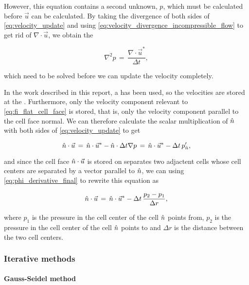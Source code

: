 However, this equation contains a second unknown, $p$, which must be calculated before $\vec{u}$ can be calculated. By taking the divergence of both sides of \eqref{eq:velocity_update} and using \eqref{eq:velocity_divergence_incompressible_flow} to get rid of $\nabla\cdot\vec{u}$, we obtain the 

\begin{equation} \label{eq:pressure_poissin_equation}
\nabla^2 p \,=\, \frac{\nabla\cdot\vec{u}^*}{\Delta t},
\end{equation}

which need to be solved before we can update the velocity completely.

In the work described in this report, a  has been used, so the velocities are stored at the . Furthermore, only the velocity component relevant to \eqref{eq:fi_flat_cell_face} is stored, that is, only the velocity component parallel to the cell face normal. We can therefore calculate the scalar multiplication of $\hat{n}$ with both sides of \eqref{eq:velocity_update} to get

\begin{equation} \label{eq:velocity_update_staggered_grid_pressure_derivative}
\hat{n}\cdot\vec{u} \,=\, \hat{n}\cdot\vec{u}^* - \hat{n}\cdot\Delta t\nabla p \,=\, \hat{n}\cdot\vec{u}^* - \Delta t\,p'_{\hat{n}},
\end{equation}

and since the cell face $\hat{n}\cdot\vec{u}$ is stored on separates two adjactent cells whose cell centers are separated by a vector parallel to $\hat{n}$, we can using \eqref{eq:phi_derivative_final} to rewrite this equation as

\begin{equation} \label{eq:velocity_update_staggered_grid_final}
\hat{n}\cdot\vec{u} \,=\, \hat{n}\cdot\vec{u}^* - \Delta t\,\frac{p_2 - p_1}{\Delta r},
\end{equation}

where $p_1$ is the pressure in the cell center of the cell $\hat{n}$ points from, $p_2$ is the pressure in the cell center of the cell $\hat{n}$ points to and $\Delta r$ is the distance between the two cell centers.

\subsubsection{Iterative methods}

\paragraph{Gauss-Seidel method}

